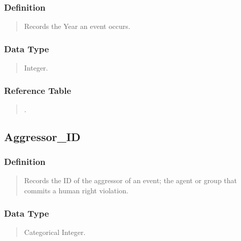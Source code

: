 \documentclass[letterpaper,10pt,english]{sphinxmanual}
\begin{document}
\subsubsection{Definition}
\label{\detokenize{database_schema:definition}}\begin{quote}

\sphinxAtStartPar
Records the Year an event occurs.
\end{quote}


\subsubsection{Data Type}
\label{\detokenize{database_schema:data-type}}\begin{quote}

\sphinxAtStartPar
Integer.
\end{quote}


\subsubsection{Reference Table}
\label{\detokenize{database_schema:reference-table}}\begin{quote}

\sphinxAtStartPar
{\hyperref[\detokenize{database_schema:overview-table}]{}}.
\end{quote}


\subsection{Aggressor\_ID}
\label{\detokenize{database_schema:aggressor-id}}

\subsubsection{Definition}
\label{\detokenize{database_schema:id2}}\begin{quote}

\sphinxAtStartPar
Records the ID of the aggressor of an event; the agent or group that commits a human right violation.
\end{quote}


\subsubsection{Data Type}
\label{\detokenize{database_schema:id3}}\begin{quote}

\sphinxAtStartPar
Categorical Integer.
\end{quote}
\end{document}
